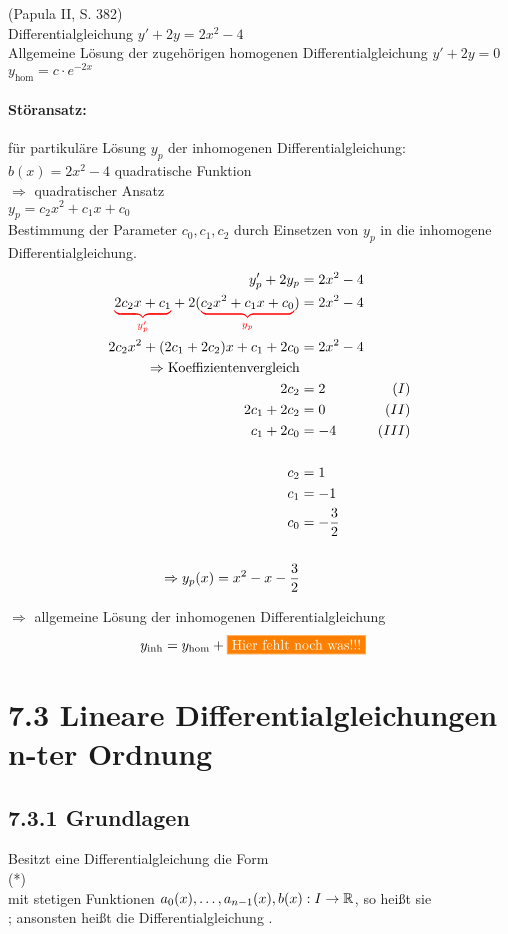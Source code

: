 \Bsp (Papula II, S. 382)\\
Differentialgleichung $y'+2y=2x^2-4$\\
Allgemeine Lösung der zugehörigen homogenen Differentialgleichung $y'+2y=0$\\
\hhspace{2cm}$y_\text{hom}=c\cdot e^{-2x}$

\paragraph{Störansatz:} für partikuläre Lösung $y_p$ der inhomogenen Differentialgleichung:\\
$b(x)=2x^2-4$ quadratische Funktion\\
$\Rightarrow$ {\flqq quadratischer\frqq} Ansatz\\
\hhspace{2cm}$y_p=c_2x^2+c_1x+c_0$\\
Bestimmung der Parameter $c_0,c_1,c_2$ durch Einsetzen von $y_p$ in die inhomogene Differentialgleichung.
\begin{align*}
y'_p+2y_p&=2x^2-4\\
\redunderbrace{2c_2x+c_1}{y'_p}+2(\redunderbrace{c_2x^2+c_1x+c_0}{y_p})&=2x^2-4\\
2c_2x^2+(2c_1+2c_2)x+c_1+2c_0&=2x^2-4\\
\Rightarrow\text{Koeffizientenvergleich}\\
2c_2&=2&(I)\\
2c_1+2c_2&=0&(II)\\
c_1+2c_0&=-4&(III)\\
\\
c_2&=1\\
c_1&=-1\\
c_0&=-\dfrac{3}{2}\\
\\
\Rightarrow y_p(x)=x^2-x-\dfrac{3}{2}
\end{align*}

$\Rightarrow$ allgemeine Lösung der inhomogenen Differentialgleichung\\
\begin{align*}
y_\text{inh}&=y_\text{hom}+\placeholder
\end{align*}

\placeholder

\section{7.3 Lineare Differentialgleichungen n-ter Ordnung}
\subsection{7.3.1 Grundlagen}
\Def Besitzt eine Differentialgleichung die Form\\
\hhspace{2cm}\quad(*)\\
mit stetigen Funktionen $a_0(x),\ldots,a_{n-1}(x),b(x):I\to\mathbb{R}$, so heißt sie\\
; ansonsten heißt die Differentialgleichung .

